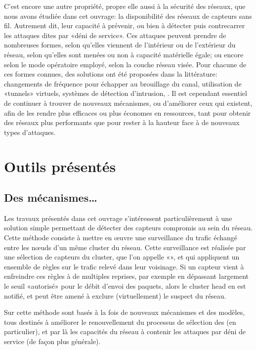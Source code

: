 C'est encore une autre propriété, propre elle aussi à la sécurité des réseaux, que nous avons étudiée dans cet ouvrage: la disponibilité des réseaux de capteurs sans fil.
Autrement dit, leur capacité à prévenir, ou bien à détecter puis contrecarrer les attaques dites par «déni de service».
Ces attaques peuvent prendre de nombreuses formes, selon qu'elles viennent de l'intérieur ou de l'extérieur du réseau, selon qu'elles sont menées ou non à capacité matérielle égale; ou encore selon le mode opératoire employé, selon la couche réseau visée.
Pour chacune de ces formes connues, des solutions ont été proposées dans la littérature: changements de fréquence pour échapper au brouillage du canal, utilisation de «tunnels» virtuels, systèmes de détection d'intrusion, \etc.
Il est cependant essentiel de continuer à trouver de nouveaux mécanismes, ou d'améliorer ceux qui existent, afin de les rendre plus efficaces ou plus économes en ressources, tant pour obtenir des réseaux plus performants que pour rester à la hauteur face à de nouveaux types d'attaques.

\section{Outils présentés}

    \subsection{Des mécanismes\dots}
Les travaux présentés dans cet ouvrage s'intéressent particulièrement à une solution simple permettant de détecter des capteurs compromis au sein du réseau.
Cette méthode consiste à mettre en œuvre une surveillance du trafic échangé entre les nœuds d'un même cluster du réseau.
Cette surveillance est réalisée par une sélection de capteurs du cluster, que l'on appelle «\cnst», et qui appliquent un ensemble de règles sur le trafic relevé dans leur voisinage.
Si un capteur vient à enfreindre ces règles à de multiples reprises, par exemple en dépassant largement le seuil «autorisé» pour le débit d'envoi des paquets, alors le cluster head en est notifié, et peut être amené à exclure (virtuellement) le suspect du réseau.

Sur cette méthode sont basés à la fois de nouveaux mécanismes et des modèles, tous destinés à améliorer le renouvellement du processus de sélection des \cnst (en particulier), et par là les capacités du réseau à contenir les attaques par déni de service (de façon plus générale).


